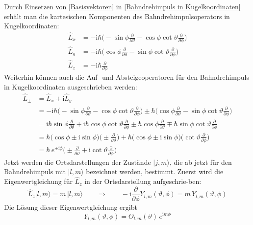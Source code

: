 \documentclass[9pt]{report}
\begin{document}
Durch Einsetzen von \eqref{Basisvektoren} in \eqref{Bahndrehimpuls in Kugelkoordinaten} erhält man die kartesischen Komponenten des Bahndrehimpulsoperators in Kugelkoordinaten:
\begin{align}
\hat{L}_{x} &= -\mathrm{i}\hbar\Big(-\sin\phi\frac{\partial}{\partial\vartheta}-\cos\phi\cot\vartheta\frac{\partial}{\partial\phi}\Big)
\\
\hat{L}_{y} &= -\mathrm{i}\hbar\Big(\cos\phi\frac{\partial}{\partial\vartheta}-\sin\phi\cot\vartheta\frac{\partial}{\partial\phi}\Big)
\\
\hat{L}_{z} &= -\mathrm{i}\hbar\frac{\partial}{\partial\phi}
\end{align}
Weiterhin können auch die Auf- und Absteigeoperatoren für den Bahndrehimpuls in Kugelkoordinaten ausgeschrieben werden:
\begin{align}
\hat{L}_{\pm} &= \hat{L}_{x}\pm\mathrm{i}\hat{L}_{y}
\\
&= -\mathrm{i}\hbar\Big(-\sin\phi\frac{\partial}{\partial\vartheta}-\cos\phi\cot\vartheta\frac{\partial}{\partial\phi}\Big)\pm\hbar\Big(\cos\phi\frac{\partial}{\partial\vartheta}-\sin\phi\cot\vartheta\frac{\partial}{\partial\phi}\Big)
\\
&= \mathrm{i}\hbar\sin\phi\frac{\partial}{\partial\vartheta}+\mathrm{i}\hbar\cos\phi\cot\vartheta\frac{\partial}{\partial\phi}\pm\hbar\cos\phi\frac{\partial}{\partial\vartheta}\mp\hbar\sin\phi\cot\vartheta\frac{\partial}{\partial\phi}
\\
&= \hbar\big(\cos\phi\pm\mathrm{i}\sin\phi\big)\Big(\pm\frac{\partial}{\partial\vartheta}\Big)+\hbar\big(\cos\phi\pm\mathrm{i}\sin\phi\big)\Big(\cot\vartheta\frac{\partial}{\partial\phi}\Big)
\\
&= \hbar\,e^{\pm\mathrm{i}\phi}\Big(\pm\frac{\partial}{\partial\vartheta}+\mathrm{i}\cot\vartheta\frac{\partial}{\partial\phi}\Big)
\end{align}
Jetzt werden die Ortsdarstellungen der Zustände $|j,m\rangle$, die ab jetzt für den Bahndrehimpuls mit $|l,m\rangle$ bezeichnet werden, bestimmt. Zuerst wird die Eigenwertgleichung für $\hat{L}_{z}$ in der Ortsdarstellung aufgeschrie-ben:
\begin{equation}
\hat{L}_{z}|l,m\rangle=m\,|l,m\rangle\qquad\Rightarrow\qquad-\mathrm{i}\frac{\partial}{\partial\phi}Y_{l,m}(\vartheta,\phi)=m\,Y_{l,m}(\vartheta,\phi)
\end{equation}
Die Lösung dieser Eigenwertgleichung ergibt
\begin{equation}
Y_{l,m}(\vartheta,\phi)=\Theta_{l,m}(\vartheta)\,e^{\mathrm{i}m\phi}
\end{equation}
\end{document}
